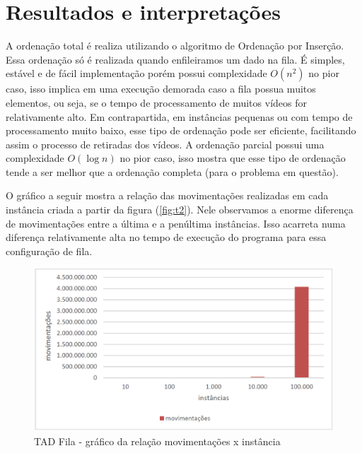 \documentclass[12pt]{article}
\begin{document}
\section{Resultados e interpretações} \label{sec:firstpage}


A ordenação total é realiza utilizando o algoritmo de Ordenação por Inserção. Essa ordenação só é realizada quando enfileiramos um dado na fila. É simples, estável e de fácil implementação porém possui complexidade $O(n^2)$ no pior caso, isso implica em uma execução demorada caso a fila possua muitos elementos, ou seja, se o tempo de processamento de muitos vídeos for relativamente alto. Em contrapartida, em instâncias pequenas ou com tempo de processamento muito baixo, esse tipo de ordenação pode ser eficiente, facilitando assim o processo de retiradas dos vídeos. A ordenação parcial possui uma complexidade $O(\log{}n)$ no pior caso, isso mostra que esse tipo de ordenação tende a ser melhor que a ordenação completa (para o problema em questão).

O gráfico a seguir mostra a relação das movimentações realizadas em cada instância criada a partir da figura (\ref{fig:t2}). Nele observamos a enorme diferença de movimentações entre a última e a penúltima instâncias. Isso acarreta numa diferença relativamente alta no tempo de execução do programa para essa configuração de fila.

\begin{figure}[h!]
\centering
\includegraphics[width=1\textwidth]{grafico2.PNG}
\caption{TAD Fila - gráfico da relação movimentações x instância}
\label{fig:g1}
\end{figure}
\end{document}
